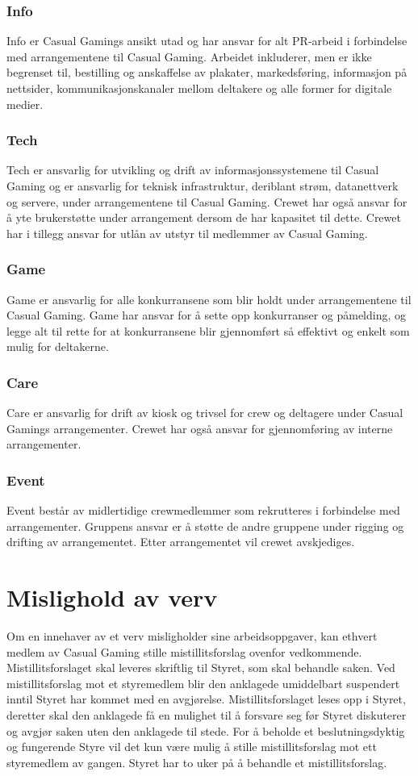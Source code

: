 \subsubsection{Info}
Info er Casual Gamings ansikt utad og har ansvar for alt PR-arbeid i forbindelse med arrangementene til Casual Gaming. Arbeidet inkluderer, men er ikke begrenset til, bestilling og anskaffelse av plakater, markedsføring, informasjon på nettsider, kommunikasjonskanaler mellom deltakere og alle former for digitale medier.

\subsubsection{Tech}
Tech er ansvarlig for utvikling og drift av informasjonssystemene til Casual Gaming og er ansvarlig for teknisk infrastruktur, deriblant strøm, datanettverk og servere, under arrangementene til Casual Gaming. Crewet har også ansvar for å yte brukerstøtte under arrangement dersom de har kapasitet til dette. Crewet har i tillegg ansvar for utlån av utstyr til medlemmer av Casual Gaming.

\subsubsection{Game}
Game er ansvarlig for alle konkurransene som blir holdt under arrangementene til Casual Gaming. Game har ansvar for å sette opp konkurranser og påmelding, og legge alt til rette for at konkurransene blir gjennomført så effektivt og enkelt som mulig for deltakerne.

\subsubsection{Care}
Care er ansvarlig for drift av kiosk og trivsel for crew og deltagere under Casual Gamings arrangementer. Crewet har også ansvar for gjennomføring av interne arrangementer.

\subsubsection{Event}
Event består av midlertidige crewmedlemmer som rekrutteres i forbindelse med arrangementer. Gruppens ansvar er å støtte de andre gruppene under rigging og drifting av arrangementet. Etter arrangementet vil crewet avskjediges.

\section{Mislighold av verv}
Om en innehaver av et verv misligholder sine arbeidsoppgaver, kan ethvert medlem av Casual Gaming stille mistillitsforslag ovenfor vedkommende. Mistillitsforslaget skal leveres skriftlig til Styret, som skal behandle saken. Ved mistillitsforslag mot et styremedlem blir den anklagede umiddelbart suspendert inntil Styret har kommet med en avgjørelse. Mistillitsforslaget leses opp i Styret, deretter skal den anklagede få en mulighet til å forsvare seg før Styret diskuterer og avgjør saken uten den anklagede til stede. For å beholde et beslutningsdyktig og fungerende Styre vil det kun være mulig å stille mistillitsforslag mot ett styremedlem av gangen. Styret har to uker på å behandle et mistillitsforslag.
